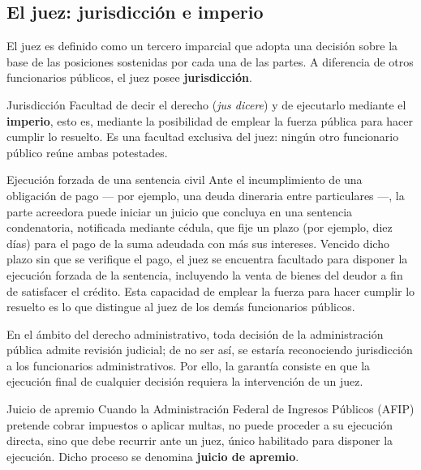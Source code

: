 \documentclass[12pt,oneside]{book}
\begin{document}
\subsection{El juez: jurisdicción e imperio}

El juez es definido como un tercero imparcial que adopta una decisión sobre la base de las posiciones sostenidas por cada una de las partes. A diferencia de otros funcionarios públicos, el juez posee \textbf{jurisdicción}.

\begin{definition}{Jurisdicción}
Facultad de decir el derecho (\emph{jus dicere}) y de ejecutarlo mediante el \textbf{imperio}, esto es, mediante la posibilidad de emplear la fuerza pública para hacer cumplir lo resuelto. Es una facultad exclusiva del juez: ningún otro funcionario público reúne ambas potestades.
\end{definition}

\begin{example}{Ejecución forzada de una sentencia civil}
Ante el incumplimiento de una obligación de pago --- por ejemplo, una deuda dineraria entre particulares ---, la parte acreedora puede iniciar un juicio que concluya en una sentencia condenatoria, notificada mediante cédula, que fije un plazo (por ejemplo, diez días) para el pago de la suma adeudada con más sus intereses. Vencido dicho plazo sin que se verifique el pago, el juez se encuentra facultado para disponer la ejecución forzada de la sentencia, incluyendo la venta de bienes del deudor a fin de satisfacer el crédito. Esta capacidad de emplear la fuerza para hacer cumplir lo resuelto es lo que distingue al juez de los demás funcionarios públicos.
\end{example}

En el ámbito del derecho administrativo, toda decisión de la administración pública admite revisión judicial; de no ser así, se estaría reconociendo jurisdicción a los funcionarios administrativos. Por ello, la garantía consiste en que la ejecución final de cualquier decisión requiera la intervención de un juez.

\begin{example}{Juicio de apremio}
Cuando la Administración Federal de Ingresos Públicos (AFIP) pretende cobrar impuestos o aplicar multas, no puede proceder a su ejecución directa, sino que debe recurrir ante un juez, único habilitado para disponer la ejecución. Dicho proceso se denomina \textbf{juicio de apremio}.
\end{example}
\end{document}
